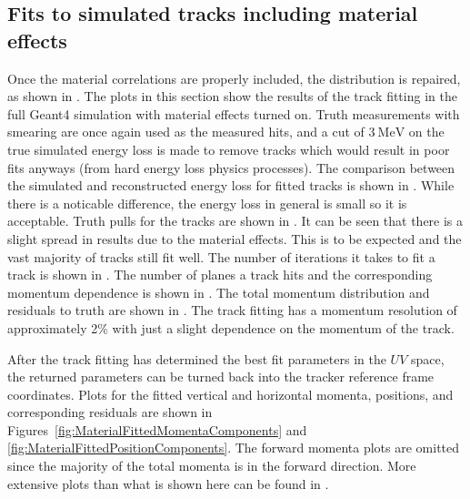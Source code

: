 

\subsection{Fits to simulated tracks including material effects}

Once the material correlations are properly included, the \chisq distribution is repaired, as shown in . The plots in this section show the results of the track fitting in the full \gmtwo Geant4 simulation with material effects turned on. Truth measurements with  smearing are once again used as the measured hits, and a cut of $\SI{3}{\MeV}$ on the true simulated energy loss is made to remove tracks which would result in poor fits anyways (from hard energy loss physics processes). The comparison between the simulated and reconstructed energy loss for fitted tracks is shown in . While there is a noticable difference, the energy loss in general is small so it is acceptable. Truth pulls for the tracks are shown in . It can be seen that there is a slight spread in results due to the material effects. This is to be expected and the vast majority of tracks still fit well. The number of iterations it takes to fit a track is shown in . The number of planes a track hits and the corresponding momentum dependence is shown in . The total momentum distribution and residuals to truth are shown in . The track fitting has a momentum resolution of approximately 2\% with just a slight dependence on the momentum of the track.

After the track fitting has determined the best fit parameters in the $UV$ space, the returned parameters can be turned back into the tracker reference frame coordinates. Plots for the fitted vertical and horizontal momenta, positions, and corresponding residuals are shown in Figures~\ref{fig:MaterialFittedMomentaComponents} and \ref{fig:MaterialFittedPositionComponents}. The forward momenta plots are omitted since the majority of the total momenta is in the forward direction. More extensive plots than what is shown here can be found in .


